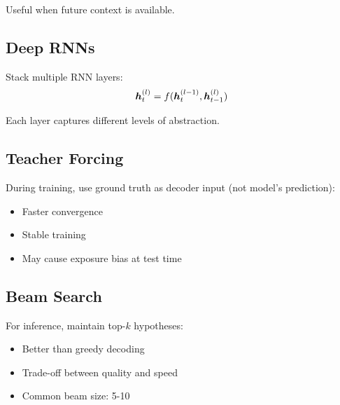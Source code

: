 Useful when future context is available.

\subsection{Deep RNNs}

Stack multiple RNN layers:
\begin{equation}
\boldsymbol{h}_t^{(l)} = f(\boldsymbol{h}_t^{(l-1)}, \boldsymbol{h}_{t-1}^{(l)})
\end{equation}

Each layer captures different levels of abstraction.

\subsection{Teacher Forcing}

During training, use ground truth as decoder input (not model's prediction):
\begin{itemize}
    \item Faster convergence
    \item Stable training
    \item May cause exposure bias at test time
\end{itemize}

\subsection{Beam Search}

For inference, maintain top-$k$ hypotheses:
\begin{itemize}
    \item Better than greedy decoding
    \item Trade-off between quality and speed
    \item Common beam size: 5-10
\end{itemize}
